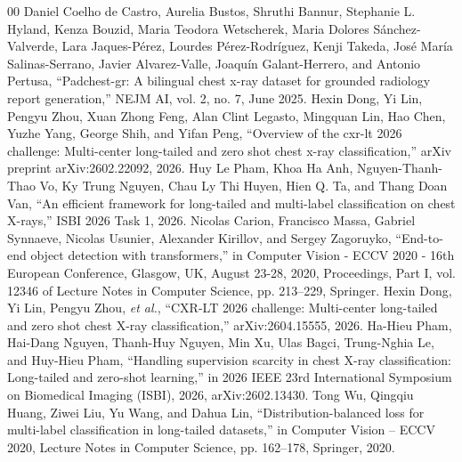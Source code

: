 \documentclass[conference]{IEEEtran}
\begin{document}
\begin{thebibliography}{00}
 Daniel Coelho de Castro, Aurelia Bustos, Shruthi Bannur, Stephanie L. Hyland, Kenza Bouzid, Maria Teodora Wetscherek, Maria Dolores S\'anchez-Valverde, Lara Jaques-P\'erez, Lourdes P\'erez-Rodr\'iguez, Kenji Takeda, Jos\'e Mar\'ia Salinas-Serrano, Javier Alvarez-Valle, Joaqu\'in Galant-Herrero, and Antonio Pertusa, ``Padchest-gr: A bilingual chest x-ray dataset for grounded radiology report generation,'' NEJM AI, vol. 2, no. 7, June 2025.
 Hexin Dong, Yi Lin, Pengyu Zhou, Xuan Zhong Feng, Alan Clint Legasto, Mingquan Lin, Hao Chen, Yuzhe Yang, George Shih, and Yifan Peng, ``Overview of the cxr-lt 2026 challenge: Multi-center long-tailed and zero shot chest x-ray classification,'' arXiv preprint arXiv:2602.22092, 2026.
 Huy Le Pham, Khoa Ha Anh, Nguyen-Thanh-Thao Vo, Ky Trung Nguyen, Chau Ly Thi Huyen, Hien Q. Ta, and Thang Doan Van, ``An efficient framework for long-tailed and multi-label classification on chest X-rays,'' ISBI 2026 Task 1, 2026.
 Nicolas Carion, Francisco Massa, Gabriel Synnaeve, Nicolas Usunier, Alexander Kirillov, and Sergey Zagoruyko, ``End-to-end object detection with transformers,'' in Computer Vision - ECCV 2020 - 16th European Conference, Glasgow, UK, August 23-28, 2020, Proceedings, Part I, vol. 12346 of Lecture Notes in Computer Science, pp. 213--229, Springer.
 Hexin Dong, Yi Lin, Pengyu Zhou, \textit{et al.}, ``CXR-LT 2026 challenge: Multi-center long-tailed and zero shot chest X-ray classification,'' arXiv:2604.15555, 2026.
 Ha-Hieu Pham, Hai-Dang Nguyen, Thanh-Huy Nguyen, Min Xu, Ulas Bagci, Trung-Nghia Le, and Huy-Hieu Pham, ``Handling supervision scarcity in chest X-ray classification: Long-tailed and zero-shot learning,'' in 2026 IEEE 23rd International Symposium on Biomedical Imaging (ISBI), 2026, arXiv:2602.13430.
 Tong Wu, Qingqiu Huang, Ziwei Liu, Yu Wang, and Dahua Lin, ``Distribution-balanced loss for multi-label classification in long-tailed datasets,'' in Computer Vision -- ECCV 2020, Lecture Notes in Computer Science, pp. 162--178, Springer, 2020.
\end{thebibliography}
\end{document}
